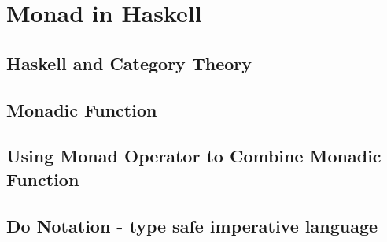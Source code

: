 \section{Monad in Haskell}
\subsection{Haskell and Category Theory}


\subsection{Monadic Function}

\subsection{Using Monad Operator to Combine Monadic Function}


\subsection{Do Notation - type safe imperative language}

